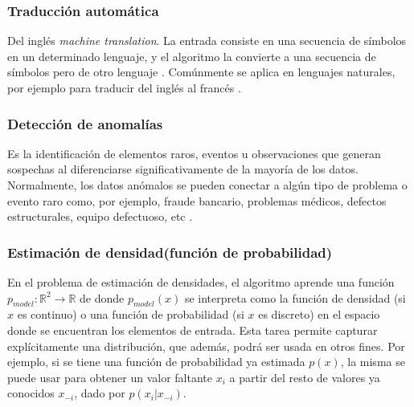 \subsubsection{Traducción automática}\label{1-TradAut}
 Del inglés \textit{machine translation}. La entrada consiste en una secuencia de símbolos en un determinado lenguaje, y el algoritmo la convierte a una secuencia de símbolos pero de otro lenguaje \cite{BengioGood}. Comúnmente se aplica en lenguajes naturales, por ejemplo para traducir del inglés al francés \cite{SutskeverSeq2seqNN, BahdanauAlignTrans}.
 
 \subsubsection{Detección de anomalías}\label{1-DetAnom}
 
 Es la identificación de elementos raros, eventos u observaciones que generan sospechas al diferenciarse significativamente de la mayoría de los datos. Normalmente, los datos anómalos se pueden conectar a algún tipo de problema o evento raro como, por ejemplo, fraude bancario, problemas médicos, defectos estructurales, equipo defectuoso, etc \cite{BengioGood}.
 
 
 
 \subsubsection{Estimación de densidad(función de probabilidad)}\label{1-EstimDen}
 
En el problema de estimación de densidades, el algoritmo aprende una función $p_{model} : \mathbb{R}^2 \rightarrow \mathbb{R}$ de donde $p_{model}(x)$ se interpreta como la función de densidad (si $x$ es continuo) o una función de probabilidad (si $x$ es discreto) en el espacio donde se encuentran los elementos de entrada. Esta tarea permite capturar explícitamente una distribución, que además, podrá ser usada en otros fines. Por ejemplo, si se tiene una función de probabilidad ya estimada $p(x)$, la misma se puede usar para obtener un valor faltante $x_i$ a partir del resto de valores ya conocidos $x_{-i}$, dado por $p(x_i| x_{-i})$. 

